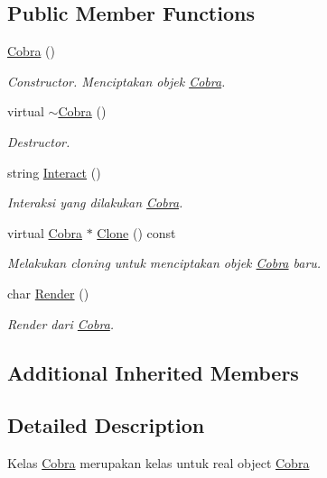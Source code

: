 \subsection*{Public Member Functions}
\begin{DoxyCompactItemize}
\item 
\hyperlink{classCobra_acc0ec4a84ca7a0ea5e53aa1e8cabd268}{Cobra} ()
\begin{DoxyCompactList}\small\item\em Constructor. Menciptakan objek \hyperlink{classCobra}{Cobra}. \end{DoxyCompactList}\item 
virtual \hyperlink{classCobra_ac109599e6a8c9a01e852c54fb6fa2687}{$\sim$\+Cobra} ()
\begin{DoxyCompactList}\small\item\em Destructor. \end{DoxyCompactList}\item 
string \hyperlink{classCobra_aa8dd0878e3d654e51bec9592c88bcab5}{Interact} ()
\begin{DoxyCompactList}\small\item\em Interaksi yang dilakukan \hyperlink{classCobra}{Cobra}. \end{DoxyCompactList}\item 
virtual \hyperlink{classCobra}{Cobra} $\ast$ \hyperlink{classCobra_a1bfd2035a0a700b6362b1853cb12949b}{Clone} () const 
\begin{DoxyCompactList}\small\item\em Melakukan cloning untuk menciptakan objek \hyperlink{classCobra}{Cobra} baru. \end{DoxyCompactList}\item 
char \hyperlink{classCobra_abca7da2ee55ce825dc49f4f9a3e87208}{Render} ()
\begin{DoxyCompactList}\small\item\em Render dari \hyperlink{classCobra}{Cobra}. \end{DoxyCompactList}\end{DoxyCompactItemize}
\subsection*{Additional Inherited Members}


\subsection{Detailed Description}
Kelas \hyperlink{classCobra}{Cobra} merupakan kelas untuk real object \hyperlink{classCobra}{Cobra} 

